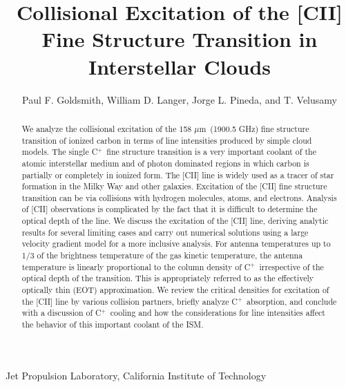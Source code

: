 \documentclass[12pt]{aastex}
\def \cp{C$^+$}
\def \C2{C{\sc II}}
\def \mic{$\mu$m}
\begin{document}
\title{Collisional Excitation of the [\C2] Fine Structure Transition in Interstellar Clouds}
\setcounter{footnote}{0}

\author{Paul F. Goldsmith, William D. Langer, Jorge L. Pineda, and T. Velusamy}

 {Jet Propulsion Laboratory, California Institute of Technology}


\begin{abstract}

We analyze the collisional excitation of the 158 \mic\ (1900.5 GHz) fine structure transition of ionized carbon in terms of line intensities produced by simple cloud models.  
The single \cp\ fine structure transition is a very important coolant of the atomic interstellar medium and of photon dominated regions in which carbon is partially or completely in ionized form. 
The [\C2] line is widely used as a tracer of star formation in the Milky Way and other galaxies.  
Excitation of the [\C2] fine structure transition can be via collisions with hydrogen molecules, atoms, and electrons.   
Analysis of [\C2] observations is complicated by the fact that it is difficult to determine the optical depth of the line.  
We discuss the excitation of the [\C2] line, deriving analytic results for several limiting cases and carry out numerical solutions using a large velocity gradient model for a more inclusive analysis.  
For antenna temperatures up to 1/3 of the brightness temperature of the gas kinetic temperature, the antenna temperature is linearly proportional to the column density of \cp\ irrespective of the optical depth of the transition.
This is appropriately referred to as the effectively optically thin (EOT) approximation.  
We review the critical densities for excitation of the [\C2] line by various collision partners, briefly analyze \cp\ absorption, and conclude with a discussion of  \cp\ cooling and how the considerations for line intensities affect the behavior of this important coolant of the ISM.



\end{abstract}
%
%
\setcounter{footnote}{0}
\end{document}
